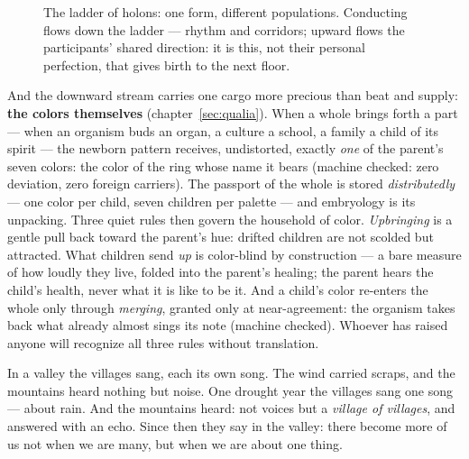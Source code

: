 \documentclass[11pt,letterpaper]{article}
\newcommand{\voiceroseneutral}[4]{%
  \foreach \vang in {90,141.4,192.8,244.3,295.7,347.1,38.6}{%
    \draw[plosgray!40] (#1,#2) -- ($(#1,#2)+(\vang:#3)$);
    \fill[plosblue!65] ($(#1,#2)+(\vang:#3)$) circle (#4);}}
\begin{document}
\begin{figure}[H]
\centering
{}
\caption{The ladder of holons: one form, different populations.
Conducting flows down the ladder --- rhythm and corridors; upward
flows the participants' shared direction: it is this, not their
personal perfection, that gives birth to the next floor.}
\label{fig:holarchy}
\end{figure}

And the downward stream carries one cargo more precious than beat
and supply: \textbf{the colors themselves}
(chapter~\ref{sec:qualia}). When a whole brings forth a part ---
when an organism buds an organ, a culture a school, a family a
child of its spirit --- the newborn pattern receives, undistorted,
exactly \emph{one} of the parent's seven colors: the color of the
ring whose name it bears (machine checked: zero deviation, zero
foreign carriers). The passport of the whole is stored
\emph{distributedly} --- one color per child, seven children per
palette --- and embryology is its unpacking. Three quiet rules then
govern the household of color. \emph{Upbringing} is a gentle pull
back toward the parent's hue: drifted children are not scolded but
attracted. What children send \emph{up} is color-blind by
construction --- a bare measure of how loudly they live, folded
into the parent's healing; the parent hears the child's health,
never what it is like to be it. And a child's color re-enters the
whole only through \emph{merging}, granted only at near-agreement:
the organism takes back what already almost sings its note (machine
checked). Whoever has raised anyone will recognize all three rules
without translation.

\begin{talebox}
In a valley the villages sang, each its own song. The wind carried
scraps, and the mountains heard nothing but noise. One drought year
the villages sang one song --- about rain. And the mountains heard:
not voices but a \emph{village of villages}, and answered with an
echo. Since then they say in the valley: there become more of us not
when we are many, but when we are about one thing.
\end{talebox}
\end{document}
